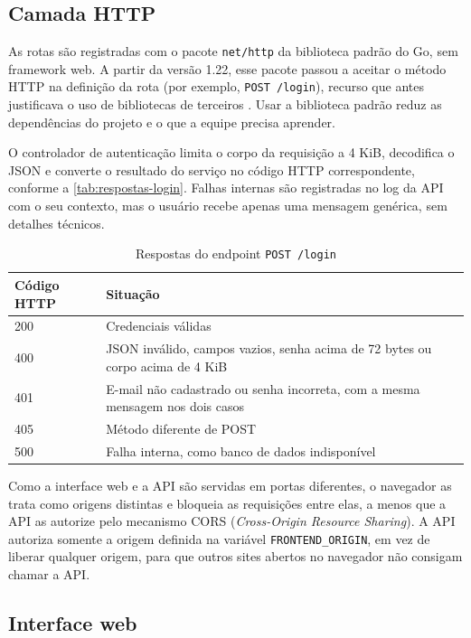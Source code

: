 \subsection{Camada HTTP}

As rotas são registradas com o pacote \texttt{net/http} da biblioteca padrão do Go, sem framework web. A partir da versão 1.22, esse pacote passou a aceitar o método HTTP na definição da rota (por exemplo, \texttt{POST /login}), recurso que antes justificava o uso de bibliotecas de terceiros \cite{go}. Usar a biblioteca padrão reduz as dependências do projeto e o que a equipe precisa aprender.

O controlador de autenticação limita o corpo da requisição a 4 KiB, decodifica o JSON e converte o resultado do serviço no código HTTP correspondente, conforme a \autoref{tab:respostas-login}. Falhas internas são registradas no log da API com o seu contexto, mas o usuário recebe apenas uma mensagem genérica, sem detalhes técnicos.

\begin{table}[htbp]
  \centering
  \caption{Respostas do endpoint \texttt{POST /login}}
  \label{tab:respostas-login}
  \begin{tabularx}{\textwidth}{lX}
    \toprule
    \textbf{Código HTTP} & \textbf{Situação} \\
    \midrule
    200 & Credenciais válidas \\
    400 & JSON inválido, campos vazios, senha acima de 72 bytes ou corpo acima de 4 KiB \\
    401 & E-mail não cadastrado ou senha incorreta, com a mesma mensagem nos dois casos \\
    405 & Método diferente de POST \\
    500 & Falha interna, como banco de dados indisponível \\
    \bottomrule
  \end{tabularx}
\end{table}

Como a interface web e a API são servidas em portas diferentes, o navegador as trata como origens distintas e bloqueia as requisições entre elas, a menos que a API as autorize pelo mecanismo CORS (\textit{Cross-Origin Resource Sharing}). A API autoriza somente a origem definida na variável \texttt{FRONTEND\_ORIGIN}, em vez de liberar qualquer origem, para que outros sites abertos no navegador não consigam chamar a API.

\subsection{Interface web}

